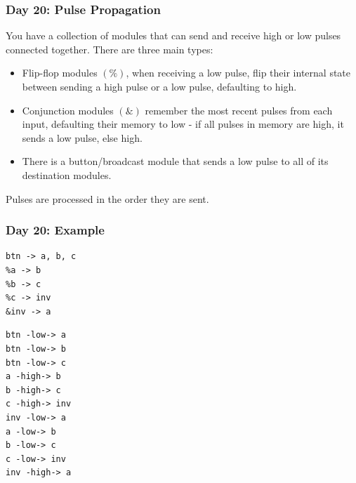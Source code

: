 \begin{frame}
\frametitle{Day 20: Pulse Propagation}

You have a collection of modules that can send and receive high or low pulses connected together. There are three main types:
\begin{itemize}
    \item Flip-flop modules $(\%)$, when receiving a low pulse, flip their internal state between sending a high pulse or a low pulse, defaulting to high.
    \item Conjunction modules $(\&)$ remember the most recent pulses from each input, defaulting their memory to low - if all pulses in memory are high, it sends a low pulse, else high.
    \item There is a button/broadcast module that sends a low pulse to all of its destination modules.
\end{itemize}\vfill

Pulses are processed in the order they are sent.

\end{frame}

\begin{frame}[fragile]
\frametitle{Day 20: Example}

\begin{center}
\begin{minipage}{0.45\textwidth}
\begin{center}
\begin{verbatim}
btn -> a, b, c
%a -> b
%b -> c
%c -> inv
&inv -> a        
\end{verbatim}
\end{center}
\end{minipage}
\begin{minipage}{0.45\textwidth}
\begin{center}
\begin{verbatim}
btn -low-> a
btn -low-> b
btn -low-> c
a -high-> b
b -high-> c
c -high-> inv
inv -low-> a
a -low-> b
b -low-> c
c -low-> inv
inv -high-> a        
\end{verbatim}
\end{center}
\end{minipage}
\end{center}

\end{frame}

